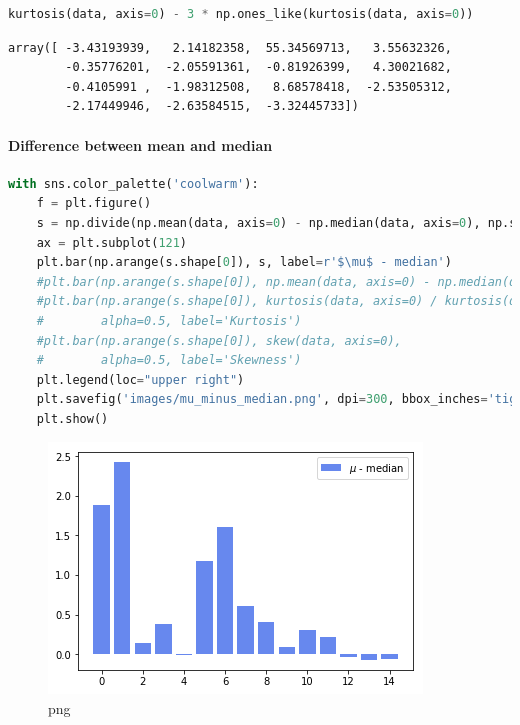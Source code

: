 \begin{lstlisting}[language=Python]
kurtosis(data, axis=0) - 3 * np.ones_like(kurtosis(data, axis=0))
\end{lstlisting}

\begin{lstlisting}
array([ -3.43193939,   2.14182358,  55.34569713,   3.55632326,
        -0.35776201,  -2.05591361,  -0.81926399,   4.30021682,
        -0.4105991 ,  -1.98312508,   8.68578418,  -2.53505312,
        -2.17449946,  -2.63584515,  -3.32445733])
\end{lstlisting}

\hypertarget{difference-between-mean-and-median}{%
\paragraph{Difference between mean and
median}\label{difference-between-mean-and-median}}

\begin{lstlisting}[language=Python]
with sns.color_palette('coolwarm'):
    f = plt.figure()
    s = np.divide(np.mean(data, axis=0) - np.median(data, axis=0), np.std(data, axis=0))
    ax = plt.subplot(121)
    plt.bar(np.arange(s.shape[0]), s, label=r'$\mu$ - median')
    #plt.bar(np.arange(s.shape[0]), np.mean(data, axis=0) - np.median(data, axis=0), label=r'$\mu$ - median')
    #plt.bar(np.arange(s.shape[0]), kurtosis(data, axis=0) / kurtosis(data, axis=0).max(axis=0),
    #        alpha=0.5, label='Kurtosis')
    #plt.bar(np.arange(s.shape[0]), skew(data, axis=0),
    #        alpha=0.5, label='Skewness')
    plt.legend(loc="upper right")
    plt.savefig('images/mu_minus_median.png', dpi=300, bbox_inches='tight')
    plt.show()
\end{lstlisting}

\begin{figure}
\centering
\includegraphics{output_35_0.png}
\caption{png}
\end{figure}


